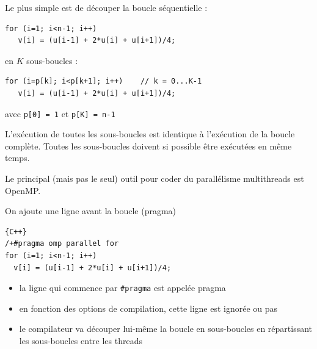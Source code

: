 \documentclass{beamer}
\begin{document}
\begin{frame}[fragile]
	Le plus simple est de découper la boucle séquentielle :

	\begin{lstlisting}
for (i=1; i<n-1; i++)
   v[i] = (u[i-1] + 2*u[i] + u[i+1])/4;
	\end{lstlisting}

\vfill
	en $K$ sous-boucles :

\begin{lstlisting}
for (i=p[k]; i<p[k+1]; i++)    // k = 0...K-1
   v[i] = (u[i-1] + 2*u[i] + u[i+1])/4;
\end{lstlisting}

avec {\tt p[0] = 1} et {\tt p[K] = n-1}

\vfill
L'exécution de toutes les sous-boucles est identique à l'exécution de la boucle complète.
Toutes les sous-boucles doivent si possible être exécutées en même temps.
\end{frame}


\begin{frame}[fragile]
	\vfill
	Le principal (mais pas le seul) outil pour coder du parallélisme multithreads est OpenMP.

	\vfill
	On ajoute une ligne avant la boucle (pragma)


\begin{center}
\begin{lstlisting}{C++}
/+#pragma omp parallel for
for (i=1; i<n-1; i++)
  v[i] = (u[i-1] + 2*u[i] + u[i+1])/4;
\end{lstlisting}
\end{center}

\begin{itemize}
	\item la ligne qui commence par \verb|#pragma| est appelée pragma
	\item en fonction des options de compilation, cette ligne est ignorée ou pas
    \item le compilateur va découper lui-même la boucle en sous-boucles en répartissant les sous-boucles entre les threads
\end{itemize}

\end{frame}
\end{document}
